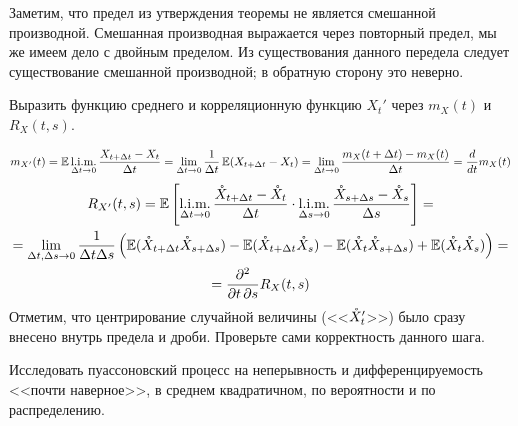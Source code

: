 Заметим, что предел из утверждения теоремы не является смешанной производной.
Смешанная производная выражается через повторный предел,
мы же имеем дело с двойным пределом.
Из существования данного передела следует существование смешанной производной;
в обратную сторону это неверно.

\begin{exercise}
    \label{exercise:moments_functions_of_derivative}
    Выразить функцию среднего и корреляционную функцию $ X_t' $ через $ m_X(t) $ и $ R_X(t, s) $.
\end{exercise}

\begin{solution}
    \[
        m_{X'}(t) = \operatorname{\mathbb{E}} \operatorname*{\textnormal{l.i.m.}}_{\Delta t \to 0} \frac{X_{t + \Delta t} - X_t}{\Delta t} = \lim_{\Delta t \to 0} \frac{1}{\Delta t} \operatorname{\mathbb{E}} (X_{t + \Delta t} - X_t) =
        \lim_{\Delta t \to 0} \frac{m_X(t + \Delta t) - m_X(t)}{\Delta t} = \frac{d}{d t} m_X(t)
    \]
    \begin{multline*}
        R_{X'}(t, s) = \operatorname{\mathbb{E}} \left[ \operatorname*{\textnormal{l.i.m.}}_{\Delta t \to 0} \frac{\mathring{X}_{t + \Delta t} - \mathring{X}_t}{\Delta t} \cdot
        \operatorname*{\textnormal{l.i.m.}}_{\Delta s \to 0} \frac{\mathring{X}_{s + \Delta s} - \mathring{X}_s}{\Delta s} \right] = \\
        = \lim_{\Delta t, \Delta s \to 0} \frac{1}{\Delta t \Delta s} \left( \operatorname{\mathbb{E}} (\mathring{X}_{t + \Delta t} \mathring{X}_{s + \Delta s}) -
        \operatorname{\mathbb{E}} (\mathring{X}_{t + \Delta t} \mathring{X}_s) - \operatorname{\mathbb{E}} (\mathring{X}_t \mathring{X}_{s + \Delta s}) + \operatorname{\mathbb{E}} (\mathring{X}_t \mathring{X}_s) \right) = \\
        = \frac{\partial^2}{\partial t \, \partial s} R_X(t, s)
    \end{multline*}
    Отметим, что центрирование случайной величины (<<$ \mathring{X}_t' $>>) было сразу внесено внутрь предела и дроби.
    Проверьте сами корректность данного шага.
\end{solution}


\begin{exercise}
    \label{exercise:calculus:Poisson_process_continuity_and_differentiability}
    Исследовать пуассоновский процесс на неперывность и дифференцируемость <<почти наверное>>, в среднем квадратичном, по вероятности и по распределению.
\end{exercise}

